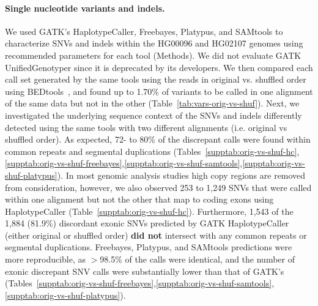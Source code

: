\documentclass{bioinfo}
\begin{document}
\paragraph{Single nucleotide variants and indels.}
We used GATK's HaplotypeCaller, Freebayes, Platypus, and SAMtools to characterize
SNVs and indels within the HG00096 and HG02107 genomes using recommended parameters for each tool (Methods). 
We did not evaluate GATK UnifiedGenotyper since it is deprecated by its developers.
We then compared each call set generated by the same tools using the reads in original vs. shuffled order using BEDtools~\citep{Quinlan2010a}, and found up to 1.70\% of variants to be called in one alignment of the same data but not in the other (Table~\ref{tab:vars-orig-vs-shuf}).
Next, we investigated the underlying sequence context of the SNVs 
and indels differently detected using the same tools with two different alignments (i.e. original vs shuffled order). 
As expected, 72- to 80\% of the discrepant calls were found within common repeats and segmental duplications (Tables~\ref{supptab:orig-vs-shuf-hc},\ref{supptab:orig-vs-shuf-freebayes},\ref{supptab:orig-vs-shuf-samtools},\ref{supptab:orig-vs-shuf-platypus}). 
In most genomic analysis studies high copy regions are removed from consideration, however, we also observed 253 to 1,249 
SNVs that were called within one alignment but not the other that map to coding exons using HaplotypeCaller (Table~\ref{supptab:orig-vs-shuf-hc}). 
Furthermore, 1,543 of the 1,884 (81.9\%) discordant exonic SNVs predicted by GATK HaplotypeCaller (either original or shuffled order) {\bf did not} intersect with any common repeats or segmental duplications.
Freebayes, Platypus, and SAMtools predictions were more reproducible, as $>$98.5\% of the calls were identical, and the number of exonic discrepant SNV calls were substantially lower than
that of GATK's (Tables~\ref{supptab:orig-vs-shuf-freebayes},\ref{supptab:orig-vs-shuf-samtools},\ref{supptab:orig-vs-shuf-platypus}). 
\end{document}
